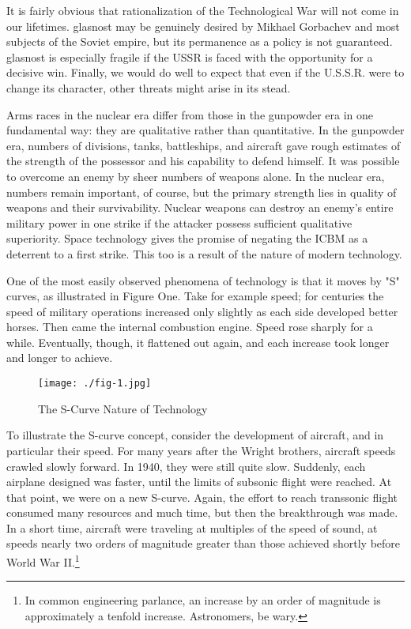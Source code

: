 It is fairly obvious that rationalization of the Technological War will not come in our lifetimes. glasnost may be genuinely desired by Mikhael Gorbachev and most subjects of the Soviet empire, but its permanence as a policy is not guaranteed. glasnost is especially fragile if the USSR is faced with the opportunity for a decisive win. Finally, we would do well to expect that even if the U.S.S.R. were to change its character, other threats might arise in its stead.

Arms races in the nuclear era differ from those in the gunpowder era in one fundamental way: they are qualitative rather than quantitative. In the gunpowder era, numbers of divisions, tanks, battleships, and aircraft gave rough estimates of the strength of the possessor and his capability to defend himself. It was possible to overcome an enemy by sheer numbers of weapons alone. In the nuclear era, numbers remain important, of course, but the primary strength lies in quality of weapons and their survivability. Nuclear weapons can destroy an enemy's entire military power in one strike if the attacker possess sufficient qualitative superiority. Space technology gives the promise of negating the ICBM as a deterrent to a first strike. This too is a result of the nature of modern technology.

One of the most easily observed phenomena of technology is that it moves by "S" curves, as illustrated in Figure One. Take for example speed; for centuries the speed of military operations increased only slightly as each side developed better horses. Then came the internal combustion engine. Speed rose sharply for a while. Eventually, though, it flattened out again, and each increase took longer and longer to achieve.
\begin{figure}
    \texttt{[image: ./fig-1.jpg]}
    \caption{The S-Curve Nature of Technology}
    \label{fig:S-Curve}
\end{figure}

To illustrate the S-curve concept, consider the development of aircraft, and in particular their speed. For many years after the Wright brothers, aircraft speeds crawled slowly forward. In 1940, they were still quite slow. Suddenly, each airplane designed was faster, until the limits of subsonic flight were reached. At that point, we were on a new S-curve. Again, the effort to reach transsonic flight consumed many resources and much time, but then the breakthrough was made. In a short time, aircraft were traveling at multiples of the speed of sound, at speeds nearly two orders of magnitude greater than those achieved shortly before World War II.\footnote{In common engineering parlance, an increase by an order of magnitude is approximately a tenfold increase. Astronomers, be wary.}

